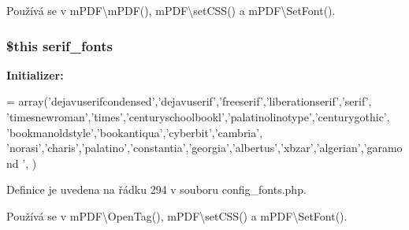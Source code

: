 Používá se v m\-P\-D\-F\textbackslash{}m\-P\-D\-F(), m\-P\-D\-F\textbackslash{}set\-C\-S\-S() a m\-P\-D\-F\textbackslash{}\-Set\-Font().

\hypertarget{config__fonts_8php_ae21efe613417a958d74084fa09721bdf}{
\subsubsection[{serif\-\_\-fonts}]{\setlength{\rightskip}{0pt plus 5cm}\$this serif\-\_\-fonts}}\label{config__fonts_8php_ae21efe613417a958d74084fa09721bdf}
{\bfseries Initializer\-:}
\begin{DoxyCode}
= array(\textcolor{stringliteral}{'dejavuserifcondensed'},\textcolor{stringliteral}{'dejavuserif'},\textcolor{stringliteral}{'freeserif'},\textcolor{stringliteral}{'liberationserif'},\textcolor{stringliteral}{'serif'},
                \textcolor{stringliteral}{'timesnewroman'},\textcolor{stringliteral}{'times'},\textcolor{stringliteral}{'centuryschoolbookl'},\textcolor{stringliteral}{'palatinolinotype'},\textcolor{stringliteral}{'centurygothic'},
                \textcolor{stringliteral}{'bookmanoldstyle'},\textcolor{stringliteral}{'bookantiqua'},\textcolor{stringliteral}{'cyberbit'},\textcolor{stringliteral}{'cambria'},
                \textcolor{stringliteral}{'norasi'},\textcolor{stringliteral}{'charis'},\textcolor{stringliteral}{'palatino'},\textcolor{stringliteral}{'constantia'},\textcolor{stringliteral}{'georgia'},\textcolor{stringliteral}{'albertus'},\textcolor{stringliteral}{'xbzar'},\textcolor{stringliteral}{'algerian'},\textcolor{stringliteral}{'garamond
      '},
)
\end{DoxyCode}


Definice je uvedena na řádku 294 v souboru config\-\_\-fonts.\-php.



Používá se v m\-P\-D\-F\textbackslash{}\-Open\-Tag(), m\-P\-D\-F\textbackslash{}set\-C\-S\-S() a m\-P\-D\-F\textbackslash{}\-Set\-Font().

